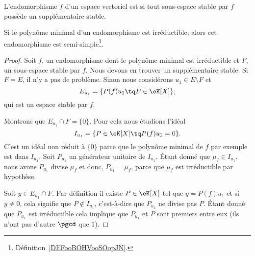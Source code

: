 \begin{definition}  \label{DEFooBOHVooSOopJN}
    L'endomorphisme \( f\) d'un espace vectoriel est  si tout sous-espace stable par \( f\) possède un supplémentaire stable.
\end{definition}

\begin{lemma}   \label{LemrFINYT}
    Si le polynôme minimal d'un endomorphisme est irréductible, alors cet endomorphisme est semi-simple\footnote{Définition~\ref{DEFooBOHVooSOopJN}.}.
\end{lemma}

\begin{proof}
    Soit \( f\), un endomorphisme dont le polynôme minimal est irréductible et \( F\), un sous-espace stable par \( f\). Nous devons en trouver un supplémentaire stable. Si \( F=E\), il n'y a pas de problème. Sinon nous considérons \( u_1\in E\setminus F\) et
    \begin{equation}
        E_{u_1}=\{ P(f)u_1\tq P\in \eK[X] \},
    \end{equation}
    qui est un espace stable par \( f\).

    Montrons que \( E_{u_1}\cap F=\{ 0 \}\). Pour cela nous étudions l'idéal
    \begin{equation}
        I_{u_1}=\{ P\in \eK[X]\tq P(f)u_1=0 \}.
    \end{equation}
    C'est un idéal non réduit à \( \{ 0 \}\) parce que le polynôme minimal de \( f\) par exemple est dans \( I_{u_1}\). Soit \( P_{u_1}\) un générateur unitaire de \( I_{u_1}\). Étant donné que \( \mu_f\in I_{u_1}\), nous avons \( P_{u_1}\) divise \( \mu_f\) et donc, \( P_{u_1}=\mu_f\), parce que \( \mu_f\) est irréductible par hypothèse.

    Soit \( y\in E_{u_1}\cap F\). Par définition il existe \( P\in\eK[X]\) tel que \( y=P(f)u_1\) et si \( y\neq 0\), cela signifie que \( P\notin I_{u_1}\), c'est-à-dire que \( P_{u_1} \) ne divise pas \( P\). Étant donné que \( P_{u_1}\) est irréductible cela implique que \( P_{u_1}\) et \( P\) sont premiers entre eux (ils n'ont pas d'autre \( \pgcd\) que \( 1\)).


\end{proof}
